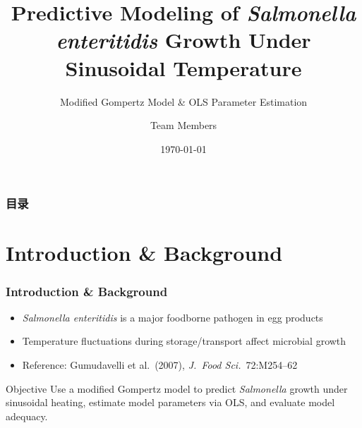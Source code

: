 \documentclass[10pt,aspectratio=169]{beamer}
\title[Salmonella Gompertz Model]{Predictive Modeling of \textit{Salmonella enteritidis} Growth Under Sinusoidal Temperature}
\subtitle{Modified Gompertz Model \& OLS Parameter Estimation}
\author[Team]{Team Members} %
\institute[ZJU]{生物系统工程与食品科学学院 \\ 浙江大学}
\date{\today}
\begin{document}
\begin{frame}
	\titlepage
\end{frame}

\begin{frame}
	\frametitle{目录}
	\tableofcontents
\end{frame}

\section{Introduction \& Background}
\begin{frame}
	\frametitle{Introduction \& Background}
	\begin{itemize}
		\item \textit{Salmonella enteritidis} is a major foodborne pathogen in egg products
		\item Temperature fluctuations during storage/transport affect microbial growth
		\item Reference: Gumudavelli et al.\ (2007), \textit{J.\ Food Sci.}\ 72:M254--62 \cite{gumudavelli2007}
	\end{itemize}
	\vspace{0.5em}
	\begin{block}{Objective}
		Use a modified Gompertz model to predict \textit{Salmonella} growth under sinusoidal heating, estimate model parameters via OLS, and evaluate model adequacy.
	\end{block}
\end{frame}

\end{document}
